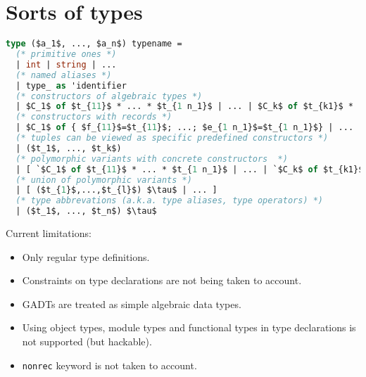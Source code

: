 \documentclass[acmsmall,review,anonymous]{acmart}\settopmatter{printfolios=true,printccs=false,printacmref=false}
\begin{document}
\section{Sorts of types}
% 

\begin{lstlisting}[language=ocaml]
type ($a_1$, ..., $a_n$) typename =
  (* primitive ones *)
  | int | string | ...
  (* named aliases *)
  | type_ as 'identifier
  (* constructors of algebraic types *)
  | $C_1$ of $t_{11}$ * ... * $t_{1 n_1}$ | ... | $C_k$ of $t_{k1}$ * ... * $t_{k n_k}$
  (* constructors with records *)
  | $C_1$ of { $f_{11}$=$t_{11}$; ...; $e_{1 n_1}$=$t_{1 n_1}$} | ... | $C_k$ of { $f_{k1}$=$t_{k1}$;  ...; $f_{k n_k}$=$t_{k n_k}$ }
  (* tuples can be viewed as specific predefined constructors *)
  | ($t_1$, ..., $t_k$)
  (* polymorphic variants with concrete constructors  *)
  | [ `$C_1$ of $t_{11}$ * ... * $t_{1 n_1}$ | ... | `$C_k$ of $t_{k1}$ * ... * $t_{k n_k}$ ] 
  (* union of polymorphic variants *)
  | [ ($t_{1}$,...,$t_{l}$) $\tau$ | ... ]
  (* type abbrevations (a.k.a. type aliases, type operators) *)
  | ($t_1$, ..., $t_n$) $\tau$
\end{lstlisting}
Current limitations:
\begin{itemize}
 \item Only regular type definitions.
 \item Constraints on type declarations are not being taken to account.
 \item GADTs are treated as simple algebraic data types.
 \item Using object types, module types and functional types in type declarations is not supported (but hackable).
 \item \verb=nonrec= keyword is not taken to account.
\end{itemize}
\end{document}
